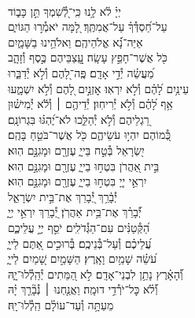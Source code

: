 \documentclass[twoside, openany, parskip=half, 11pt]{book}
\begin{document}
{\begin{narrow}
\\
יְיָ֗ לֹ֫א לָ֥נוּ \hfill כִּֽי־לְ֭֯שִׁמְךָ תֵּ֣ן כָּב֑וֹד \\ עַל־חַ֝סְדְּ֯ךָ֗ עַל־אֲמִתֶּֽךָ׃ \hfill
לָ֭מָּה יֹאמְ֯ר֣וּ הַגּוֹיִ֑ם\\ אַיֵּה־נָ֗֝א אֱלֹהֵיהֶֽם׃ \hfill
וֵאלֹהֵ֥ינוּ בַשָּׁמָ֑יִם\\ כֹּ֖ל אֲשֶׁר־חָפֵ֣ץ עָשָֽׂה׃ \hfill
עֲֽ֭צַבֵּיהֶם כֶּ֣סֶף וְ֯זָהָ֑ב\\ מַ֝עֲשֵׂ֗ה יְ֯דֵ֣י אָדָֽם׃ \hfill
פֶּֽה־לָ֭הֶם וְ֯לֹ֣א יְ֯דַבֵּ֑רוּ\\ עֵינַ֥יִם לָ֝הֶ֗ם וְ֯לֹ֣א יִרְאֽוּ׃ \hfill
אׇזְנַ֣יִם לָ֭הֶם וְ֯לֹ֣א יִשְׁמָ֑עוּ\\ אַ֥ף לָ֝הֶ֗ם וְ֯לֹ֣א יְ֯רִיחֽוּן׃ \hfill
יְ֯דֵיהֶ֤ם ׀ וְ֯לֹ֬א יְ֯מִישׁ֗וּן\\ רַ֭גְלֵיהֶם וְ֯לֹ֣א יְ֯הַלֵּ֑כוּ \hfill לֹא־יֶ֝הְגּ֗וּ בִּגְרוֹנָֽם׃ \\
כְּ֭֯מוֹהֶם יִהְי֣וּ עֹשֵׂיהֶ֑ם \hfill כֹּ֖ל אֲשֶׁר־בֹּטֵ֣חַ בָּהֶֽם׃ \\
יִ֭שְׂרָאֵל בְּ֯טַ֣ח בַּייָ֑ \hfill עֶזְרָ֖ם וּמָגִנָּ֣ם הֽוּא׃ \\
בֵּ֣ית אַ֭הֲרֹן בִּטְח֣וּ בַייָ֑ \hfill עֶזְרָ֖ם וּמָגִנָּ֣ם הֽוּא׃ \\
יִרְאֵ֣י יְיָ֭ בִּטְח֣וּ בַייָ֑ \hfill עֶזְרָ֖ם וּמָגִנָּ֣ם הֽוּא׃ \\

יְ֯בָ֫רֵ֥ךְ יְ֭֯בָרֵךְ \hfill אֶת־בֵּ֣ית יִשְׂרָאֵ֑ל\\ יְ֯֝בָרֵ֗ךְ אֶת־בֵּ֥ית אַהֲרֹֽן׃ \hfill
יְ֭֯בָרֵךְ יִרְאֵ֣י יְיָ֑\\ הַ֝קְּ֯טַנִּ֗ים עִם־הַגְּ֯דֹלִֽים׃ \hfill
יֹסֵ֣ף יְיָ֣ עֲלֵיכֶ֑ם\\ עֲ֝לֵיכֶ֗ם וְ֯עַל־בְּ֯נֵיכֶֽם׃ \hfill
בְּ֯רוּכִ֣ים אַ֭תֶּם לַייָ֑\\ עֹ֝שֵׂ֗ה שָׁמַ֥יִם וָאָֽרֶץ׃ \hfill
הַשָּׁמַ֣יִם שָׁ֭מַיִם לַייָ֑\\ וְ֯֝הָאָ֗רֶץ נָתַ֥ן לִבְנֵי־אָדָֽם׃ \hfill
לֹ֣א הַ֭מֵּתִים יְ֯הַֽלְ֯לוּ־יָ֑הּ\\ וְ֯֝לֹ֗א כׇּל־יֹרְ֯דֵ֥י דוּמָֽה׃ \hfill
וַאֲנַ֤חְנוּ ׀ נְ֯בָ֘רֵ֤ךְ יָ֗הּ\\ מֵעַתָּ֥ה וְ֯עַד־עוֹלָ֗ם הַֽלְ֯לוּ־יָֽהּ׃ \hfill \break



\end{narrow}}
\end{document}
